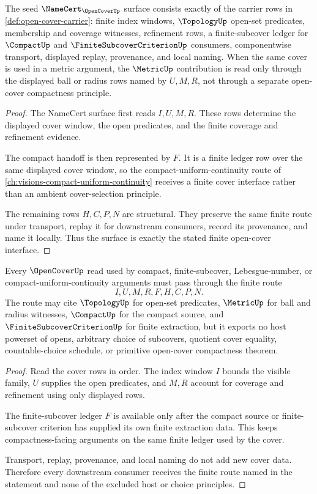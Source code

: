 \begin{theorem}
\label{thm:open-cover-namecert-surface}
The seed $\NameCert_{\OpenCoverUp}$ surface consists exactly of the carrier rows in \autoref{def:open-cover-carrier}: finite index windows, $\TopologyUp$ open-set predicates, membership and coverage witnesses, refinement rows, a finite-subcover ledger for $\CompactUp$ and $\FiniteSubcoverCriterionUp$ consumers, componentwise transport, displayed replay, provenance, and local naming. When the same cover is used in a metric argument, the $\MetricUp$ contribution is read only through the displayed ball or radius rows named by $U,M,R$, not through a separate open-cover compactness principle.
\end{theorem}
\begin{proof}
The NameCert surface first reads $I,U,M,R$. These rows determine the displayed cover window, the open predicates, and the finite coverage and refinement evidence.

The compact handoff is then represented by $F$. It is a finite ledger row over the same displayed cover window, so the compact-uniform-continuity route of \autoref{ch:visions-compact-uniform-continuity} receives a finite cover interface rather than an ambient cover-selection principle.

The remaining rows $H,C,P,N$ are structural. They preserve the same finite route under transport, replay it for downstream consumers, record its provenance, and name it locally. Thus the surface is exactly the stated finite open-cover interface.
\end{proof}

\begin{theorem}
\label{thm:open-cover-constructive-boundary}
Every $\OpenCoverUp$ read used by compact, finite-subcover, Lebesgue-number, or compact-uniform-continuity arguments must pass through the finite route
$$
I,U,M,R,F,H,C,P,N .
$$
The route may cite $\TopologyUp$ for open-set predicates, $\MetricUp$ for ball and radius witnesses, $\CompactUp$ for the compact source, and $\FiniteSubcoverCriterionUp$ for finite extraction, but it exports no host powerset of opens, arbitrary choice of subcovers, quotient cover equality, countable-choice schedule, or primitive open-cover compactness theorem.
\end{theorem}
\begin{proof}
Read the cover rows in order. The index window $I$ bounds the visible family, $U$ supplies the open predicates, and $M,R$ account for coverage and refinement using only displayed rows.

The finite-subcover ledger $F$ is available only after the compact source or finite-subcover criterion has supplied its own finite extraction data. This keeps compactness-facing arguments on the same finite ledger used by the cover.

Transport, replay, provenance, and local naming do not add new cover data. Therefore every downstream consumer receives the finite route named in the statement and none of the excluded host or choice principles.
\end{proof}

